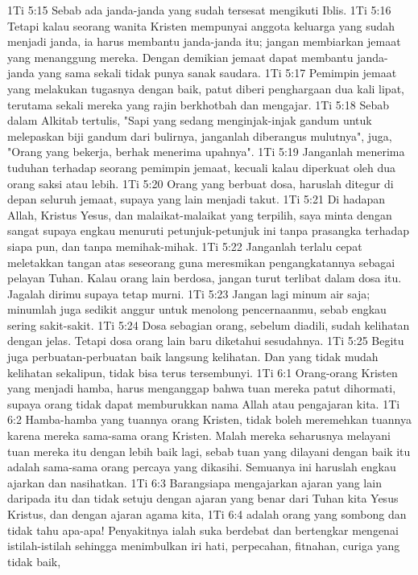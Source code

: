 1Ti 5:15  Sebab ada janda-janda yang sudah tersesat mengikuti Iblis.
1Ti 5:16  Tetapi kalau seorang wanita Kristen mempunyai anggota keluarga yang sudah menjadi janda, ia harus membantu janda-janda itu; jangan membiarkan jemaat yang menanggung mereka. Dengan demikian jemaat dapat membantu janda-janda yang sama sekali tidak punya sanak saudara.
1Ti 5:17  Pemimpin jemaat yang melakukan tugasnya dengan baik, patut diberi penghargaan dua kali lipat, terutama sekali mereka yang rajin berkhotbah dan mengajar.
1Ti 5:18  Sebab dalam Alkitab tertulis, "Sapi yang sedang menginjak-injak gandum untuk melepaskan biji gandum dari bulirnya, janganlah diberangus mulutnya", juga, "Orang yang bekerja, berhak menerima upahnya".
1Ti 5:19  Janganlah menerima tuduhan terhadap seorang pemimpin jemaat, kecuali kalau diperkuat oleh dua orang saksi atau lebih.
1Ti 5:20  Orang yang berbuat dosa, haruslah ditegur di depan seluruh jemaat, supaya yang lain menjadi takut.
1Ti 5:21  Di hadapan Allah, Kristus Yesus, dan malaikat-malaikat yang terpilih, saya minta dengan sangat supaya engkau menuruti petunjuk-petunjuk ini tanpa prasangka terhadap siapa pun, dan tanpa memihak-mihak.
1Ti 5:22  Janganlah terlalu cepat meletakkan tangan atas seseorang guna meresmikan pengangkatannya sebagai pelayan Tuhan. Kalau orang lain berdosa, jangan turut terlibat dalam dosa itu. Jagalah dirimu supaya tetap murni.
1Ti 5:23  Jangan lagi minum air saja; minumlah juga sedikit anggur untuk menolong pencernaanmu, sebab engkau sering sakit-sakit.
1Ti 5:24  Dosa sebagian orang, sebelum diadili, sudah kelihatan dengan jelas. Tetapi dosa orang lain baru diketahui sesudahnya.
1Ti 5:25  Begitu juga perbuatan-perbuatan baik langsung kelihatan. Dan yang tidak mudah kelihatan sekalipun, tidak bisa terus tersembunyi.
1Ti 6:1  Orang-orang Kristen yang menjadi hamba, harus menganggap bahwa tuan mereka patut dihormati, supaya orang tidak dapat memburukkan nama Allah atau pengajaran kita.
1Ti 6:2  Hamba-hamba yang tuannya orang Kristen, tidak boleh meremehkan tuannya karena mereka sama-sama orang Kristen. Malah mereka seharusnya melayani tuan mereka itu dengan lebih baik lagi, sebab tuan yang dilayani dengan baik itu adalah sama-sama orang percaya yang dikasihi. Semuanya ini haruslah engkau ajarkan dan nasihatkan.
1Ti 6:3  Barangsiapa mengajarkan ajaran yang lain daripada itu dan tidak setuju dengan ajaran yang benar dari Tuhan kita Yesus Kristus, dan dengan ajaran agama kita,
1Ti 6:4  adalah orang yang sombong dan tidak tahu apa-apa! Penyakitnya ialah suka berdebat dan bertengkar mengenai istilah-istilah sehingga menimbulkan iri hati, perpecahan, fitnahan, curiga yang tidak baik,

